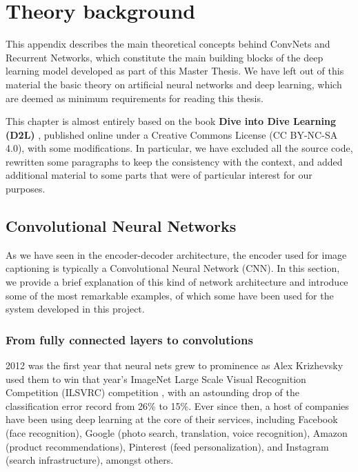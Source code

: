 \appendix
\chapter{Theory background}
\label{ch:theory}


This appendix describes the main theoretical concepts behind ConvNets and Recurrent Networks, which constitute the main building blocks of the deep learning model developed as part of this Master Thesis. We have left out of this material the basic theory on artificial neural networks and deep learning, which are deemed as minimum requirements for reading this thesis.

This chapter is almost entirely based on the book \textbf{Dive into Dive Learning (D2L)} \citep{Zhang2019d2l}, published online under a Creative Commons License (CC BY-NC-SA 4.0), with some modifications. In particular, we have excluded all the source code, rewritten some paragraphs to keep the consistency with the context, and added additional material to some parts that were of particular interest for our purposes.


\section{Convolutional Neural Networks}\label{sec:cnn}

As we have seen in the encoder-decoder architecture, the encoder used for image captioning is typically a Convolutional Neural Network (CNN). In this section, we provide a brief explanation of this kind of network architecture and introduce some of the most remarkable examples, of which some have been used for the system developed in this project.

\subsection{From fully connected layers to convolutions}

2012 was the first year that neural nets grew to prominence as Alex Krizhevsky used them to win that year’s ImageNet Large Scale Visual Recognition Competition (ILSVRC) competition \citep{Krizhevsky2012}, with an astounding drop of the classification error record from 26\% to 15\%. Ever since then, a host of companies have been using deep learning at the core of their services, including Facebook (face recognition), Google (photo search, translation, voice recognition), Amazon (product recommendations), Pinterest (feed personalization), and Instagram (search infrastructure), amongst others.

